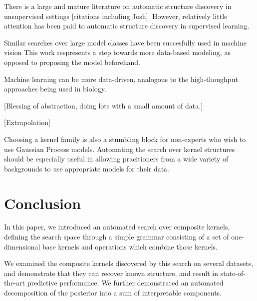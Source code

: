 \documentclass[twoside]{article}
\begin{document}
There is a large and mature literature on automatic structure discovery in unsupervised settings [citations including Josh].  However, relatively little attention has been paid to automatic structure discovery in supervised learning.

Similar searches over large model classes have been succesfully used in machine vision \cite{pinto2009high}
This work respresents a step towards more data-based modeling, as opposed to proposing the model beforehand.


Machine learning can be more data-driven, analogous to the high-thoughput approaches being used in biology. 

[Blessing of abstraction, doing lots with a small amount of data.]

[Extrapolation]

Choosing a kernel family is also a stumbling block for non-experts who wish to use Gaussian Process models.  Automating the search over kernel structures should be especially useful in allowing pracitioners from a wide variety of backgrounds to use appropriate models for their data.




\section{Conclusion}

In this paper, we introduced an automated search over composite kernels, defining the search space through a simple grammar consisting of a set of one-dimensional base kernels and operations which combine those kernels.

We examined the composite kernels discovered by this search on several datasets, and demonstrate that they can recover known structure, and result in state-of-the-art predictive performance.  We further demonstrated an automated decomposition of the posterior into a sum of interpretable components.


\end{document}

